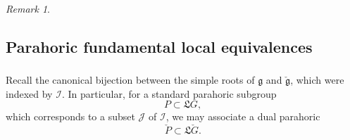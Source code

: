 \documentclass[11pt,reqno]{amsart}
\newcommand{\fL}{\mathfrak{L}}
\newcommand{\fg}{\mathfrak{g}}
\theoremstyle{remark}
\newtheorem{re}[subsubsection]{Remark}
\numberwithin{equation}{section}
\newcommand{\sJ}{\mathscr{J}}
\newcommand{\cG}{\check{G}}
\newcommand{\Vect}{\mathsf{Vect}}
\begin{document}
\begin{re}
 \end{re}
 
 
\subsection{Parahoric fundamental local equivalences}\label{ss:parahoric}

\subsubsection{}Recall the canonical bijection between the simple roots of 
$\fg$ and 
$\check{\fg}$, which were indexed by $\mathscr{I}$. In particular, for a 
standard parahoric subgroup 
%
\[ P \subset \fL G,\]
%
which  corresponds to a subset $\sJ$ of $\mathscr{I}$, we may 
associate a dual parahoric 
%
\[\check{P} \subset \fL\cG. \]
%
\end{document}

